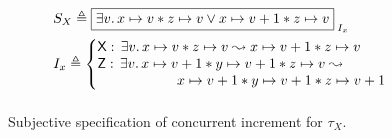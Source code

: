 \begin{figure}
\noindent\makebox[\linewidth]{\rule{\linewidth}{1pt}}
%
\[
\begin{array}{l }
	S_{X} \eqdef 
	\shared{
		\exsts{v}   \cell{x}{v}  * \cell{z}{v}  \lor \cell{x}{v+1}  * \cell{z}{v}
	}{I_x}\vspace*{5pt}\\
	

	
	I_x \eqdef \left\{
		\begin{array}{@{}l@{}}
			\textsf{X}:\, \exsts{v} \cell{x}{v} * \cell{z}{v}  \swap  \cell{x}{v+1} * \cell{z}{v}\\
			\textsf{Z}:\, \exsts{v} \cell{x}{v+1} *  \cell{y}{v+1} * \cell{z}{v}\swap\null\\
			\hspace*{2cm} \cell{x}{v+1} * \cell{y}{v+1} * \cell{z}{v+1}\\
		\end{array}			
	
	\right.
	\vspace*{5pt}\\
	
\end{array} \vspace*{-5pt}
\]
%
\noindent\makebox[\linewidth]{\rule{\linewidth}{1pt}}
\caption{Subjective specification of concurrent increment for $\tau_X$.}
\label{fig:concurrentIncSubjectiveSpec}
\end{figure} 
%
%

